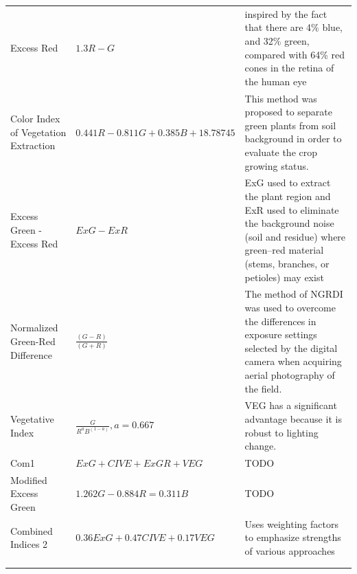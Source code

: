 \documentclass[letterpaper]{article}
\begin{document}
\begin{longtable}{x{\dimexpr.2\tabcolsep}
                  x{\dimexpr.4\tabcolsep}
                  x{\dimexpr.4\tabcolsep}}
		Excess Red      
		& $1.3 R - G$ 
		& inspired by the fact that there are 4\% blue, and 32\% green, compared with 64\% red cones in the retina of the human eye
\tabularnewline\addlinespace

		Color Index of Vegetation Extraction      
		& $0.441 R - 0.811 G + 0.385 B + 18.78745$
		& This method was proposed to separate green plants from soil background in order to evaluate the crop growing status.
\tabularnewline\addlinespace

		Excess Green - Excess Red   
		& $ExG - ExR$ 
		& ExG used to extract the plant region and ExR used to eliminate the background noise (soil and residue) where green–red material (stems, branches, or petioles) may exist
\tabularnewline\addlinespace

		Normalized Green-Red Difference    
		& $\frac {(G - R)} {(G + R)}$ 
		& The method of NGRDI was used to overcome the differences in exposure settings selected by the digital camera when acquiring aerial photography of the field. 
\tabularnewline\addlinespace

		Vegetative Index      
		& $\frac {G} {R^aB^{(1-a)}}, a = 0.667$ 
		& VEG has a significant advantage because it is robust to lighting change.
\tabularnewline\addlinespace

		Com1   
		& $ExG + CIVE + ExGR + VEG$ 
		& TODO
\tabularnewline\addlinespace

		Modified Excess Green      
		& $1.262G - 0.884R = 0.311B$ 
		& TODO 
\tabularnewline\addlinespace

		Combined Indices 2      
		& $0.36ExG + 0.47CIVE + 0.17VEG$ 
		& Uses weighting factors to emphasize strengths of various approaches
\tabularnewline\addlinespace

\tabularnewline\addlinespace
\end{longtable}
%
%
\end{document}
